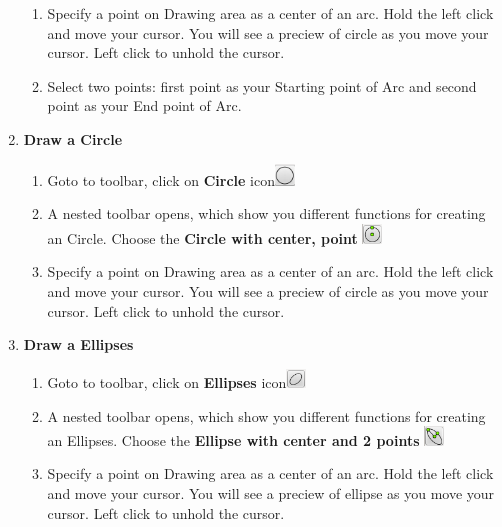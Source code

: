 \begin{enumerate}
{\begin{enumerate}
    \item{Specify a point on Drawing area as a center of an arc. Hold the left click and move your cursor. You will see a preciew of circle as you move your cursor. Left click to unhold the cursor.}
    \item{Select two points: first point as your Starting point of Arc and second point as your End point of Arc.} 
    \end{enumerate}}
%
\vspace{.25in}    
\item{\textbf{Draw a Circle}\begin{enumerate}
    \item{Goto to toolbar, click on \textbf{Circle} icon\includegraphics[width=20px]{./images/circle.png}}
    \item{A nested toolbar opens, which show you different functions for creating an Circle. Choose the \textbf{Circle with center, point }\includegraphics[width=20px]{./images/circle_cp.png}}
    \item{Specify a point on Drawing area as a center of an arc. Hold the left click and move your cursor. You will see a preciew of circle as you move your cursor. Left click to unhold the cursor.}\end{enumerate}}
%
\vspace{.25in}
\item{\textbf{Draw a Ellipses}\begin{enumerate}
    \item{Goto to toolbar, click on \textbf{Ellipses} icon\includegraphics[width=20px]{./images/ellipse.png}}
    \item{A nested toolbar opens, which show you different functions for creating an Ellipses. Choose the \textbf{Ellipse with center and 2 points }\includegraphics[width=20px]{./images/ellipse_c2p.png}}
    \item{Specify a point on Drawing area as a center of an arc. Hold the left click and move your cursor. You will see a preciew of ellipse as you move your cursor. Left click to unhold the cursor.}\end{enumerate}}

\end{enumerate}
